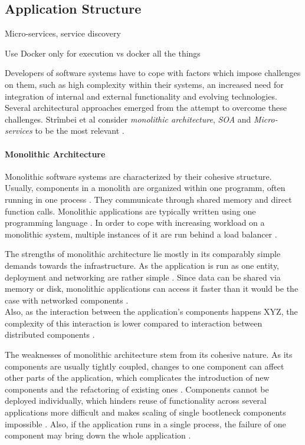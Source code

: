 
\subsection{Application Structure} %
  \label{sub:application_structure}
  Micro-services, service discovery \cite{Stubbs2015Distributed}

  Use Docker only for execution vs docker all the things

  Developers of software systems have to cope with factors which impose challenges on them, such as high complexity within their systems, an increased need for integration of internal and external functionality and evolving technologies. Several architectural approaches emerged from the attempt to overcome these challenges. Strîmbei et al consider \emph{monolithic architecture}, \emph{\ac{SOA}} and \emph{Micro-services} to be the most relevant \cite[p.~13]{Strimbei2015Software}.

  \paragraph{Monolithic Architecture} %
    \label{par:monolithic_architecture}
    Monolithic software systems are characterized by their cohesive structure. Usually, components in a monolith are organized within one programm, often running in one process \cite[p.~35]{Stubbs2015Distributed}. They communicate through shared memory and direct function calls. Monolithic applications are typically written using one programming language \cite[p.~14]{Strimbei2015Software}. In order to cope with increasing workload on a monolithic system, multiple instances of it are run behind a load balancer \cite[p.~35]{Stubbs2015Distributed}.

    The strengths of monolithic architecture lie mostly in its comparably simple demands towards the infrastructure. As the application is run as one entity, deployment and networking are rather simple \cite[p.~35]{Stubbs2015Distributed}. Since data can be shared via memory or disk, monolithic applications can access it faster than it would be the case with networked components \cite[p.~14]{Strimbei2015Software}. \\
    Also, as the interaction between the application's components happens XYZ, the complexity of this interaction is lower compared to interaction between distributed components \cite[p.~14]{Strimbei2015Software}.

    The weaknesses of monolithic architecture stem from its cohesive nature. As its components are usually tightly coupled, changes to one component can affect other parts of the application, which complicates the introduction of new components and the refactoring of existing ones \cite{Stubbs2015Distributed}.
    Components cannot be deployed individually, which hinders reuse of functionality across several applications more difficult and makes scaling of single bootleneck components impossible \cite{Stubbs2015Distributed}. Also, if the application runs in a single process, the failure of one component may bring down the whole application \cite[p.~5]{Newman2015Building}.

